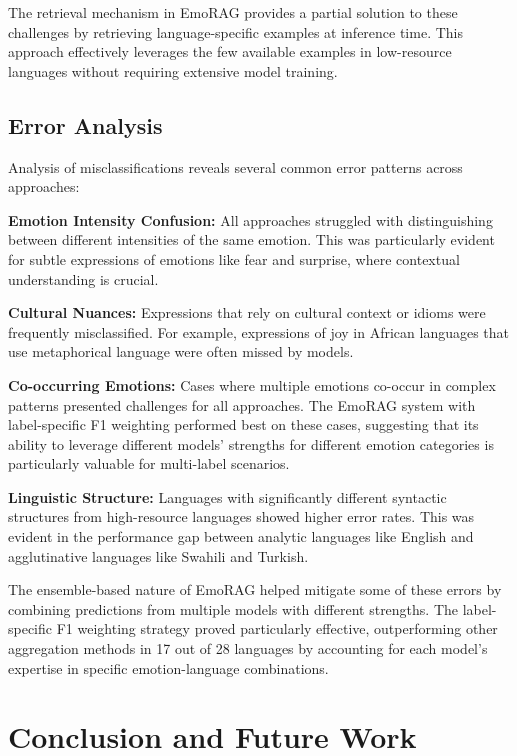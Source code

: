 \documentclass[a4paper,12pt]{extarticle}
\begin{document}
The retrieval mechanism in EmoRAG provides a partial solution to these challenges by retrieving language-specific examples at inference time. This approach effectively leverages the few available examples in low-resource languages without requiring extensive model training.

\subsection{Error Analysis}

Analysis of misclassifications reveals several common error patterns across approaches:

\textbf{Emotion Intensity Confusion:} All approaches struggled with distinguishing between different intensities of the same emotion. This was particularly evident for subtle expressions of emotions like fear and surprise, where contextual understanding is crucial.

\textbf{Cultural Nuances:} Expressions that rely on cultural context or idioms were frequently misclassified. For example, expressions of joy in African languages that use metaphorical language were often missed by models.

\textbf{Co-occurring Emotions:} Cases where multiple emotions co-occur in complex patterns presented challenges for all approaches. The EmoRAG system with label-specific F1 weighting performed best on these cases, suggesting that its ability to leverage different models' strengths for different emotion categories is particularly valuable for multi-label scenarios.

\textbf{Linguistic Structure:} Languages with significantly different syntactic structures from high-resource languages showed higher error rates. This was evident in the performance gap between analytic languages like English and agglutinative languages like Swahili and Turkish.

The ensemble-based nature of EmoRAG helped mitigate some of these errors by combining predictions from multiple models with different strengths. The label-specific F1 weighting strategy proved particularly effective, outperforming other aggregation methods in 17 out of 28 languages by accounting for each model's expertise in specific emotion-language combinations.

\section{Conclusion and Future Work}
\end{document}
